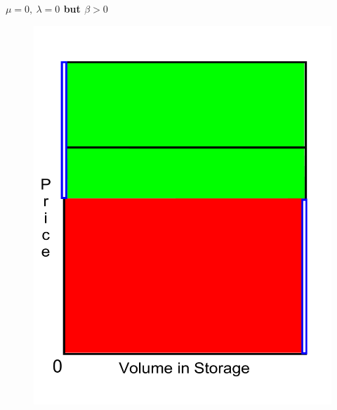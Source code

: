 \documentclass{beamer}
\begin{document}
\begin{frame}
{\bf  $\mu = 0,~ \lambda = 0$ but $\beta > 0$}
\begin{figure}[hbt]
  \includegraphics[scale= 0.25]{NonCostBetaNot0.pdf}
\end{figure}
\end{frame}
\end{document}
